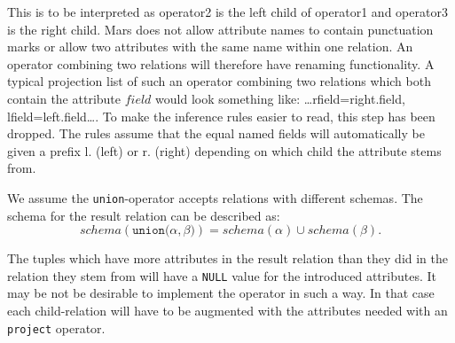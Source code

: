 This is to be interpreted as \textsf{operator2} is the left child of \textsf{operator1} and \textsf{operator3} is
the right child. Mars does not allow attribute names to contain punctuation marks or allow two attributes with the
same name within one relation. An operator combining two relations will therefore have renaming functionality. A
typical projection list of such an operator combining two relations which both contain the attribute $field$ would
look something like: \textsf{\ldots rfield=right.field, lfield=left.field\ldots}. To make the inference rules
easier to read, this step has been dropped. The rules assume that the equal
named fields will automatically be given a prefix \textsf{l.} (left) or
\textsf{r.} (right) depending on which child the attribute stems from.

We assume the \texttt{union}-operator accepts relations with different schemas. The schema for the result
relation can be described as:
\begin{equation*}
schema(\texttt{union(}\alpha, \beta\texttt{)}) = schema(\alpha) \cup schema(\beta).
\end{equation*}

The tuples which have more attributes in the result relation than they did in the relation they stem from will
have a \texttt{NULL} value for the introduced attributes. It may be not be
desirable to implement the operator in such a way. In that case each
child-relation will have to be augmented with the attributes needed with an \texttt{project} operator.
